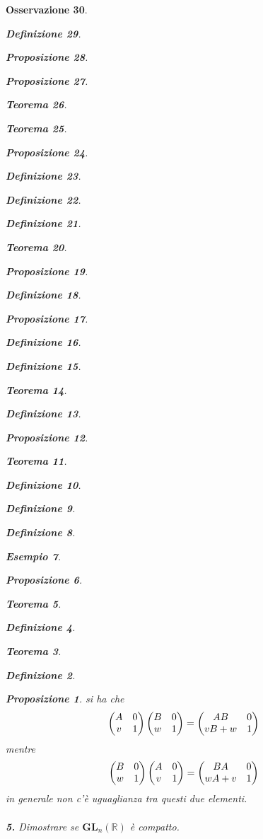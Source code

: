 \documentclass[oneside, 11pt]{amsbook}
\makeatletter
\newcommand{\0}{{(0)}}
\newcommand{\3}{{(3)}}
\theoremstyle{colonplain}
\newtheorem{thm}{Teorema}[chapter]
\newtheorem{prop}[thm]{Proposizione}
\theoremstyle{colondefinition}
\newtheorem{defn}[thm]{Definizione}
\newtheorem{ex}[thm]{Esempio}
\theoremstyle{colonremark}
\newtheorem{rmk}[thm]{Osservazione}
\numberwithin{equation}{chapter}
\renewcommand{\proofname}{Dimostrazione}
\renewenvironment{proof}[1][\proofname]{\par
  \pushQED{\end{proof}}%
  \normalfont \topsep6\p@\@plus6\p@\relax
  \trivlist
  \item[\hskip\labelsep\bfseries #1:]\ignorespaces
}{%
  \popQED\endtrivlist\@endpefalse
}
\makeatother
\begin{document}
\begin{rmk}
\begin{defn}
\begin{prop}
\begin{prop}
\begin{thm}
\begin{thm}
\begin{prop}
\begin{defn}
\begin{defn}
\begin{defn}
\begin{thm}
\begin{prop}
\begin{defn}
\begin{prop}
\begin{defn}
\begin{defn}
\begin{thm}
\begin{defn}
\begin{prop}
\begin{thm}
\begin{defn}
\begin{defn}
\begin{defn}
\begin{ex}
\begin{prop}
\begin{thm}
\begin{defn}
\begin{thm}
\begin{defn}
\begin{prop}
\begin{proof}
\begin{proof}
\begin{proof}
\begin{proof} si ha che
\begin{align}
    \begin{pmatrix}
        A & 0 \\
        v & 1
    \end{pmatrix}
    \begin{pmatrix}
        B & 0 \\
        w & 1
    \end{pmatrix} = 
    \begin{pmatrix}
        AB & 0 \\
        vB + w & 1
    \end{pmatrix} \notag
\end{align}
mentre
\begin{align}
    \begin{pmatrix}
        B & 0 \\
        w & 1
    \end{pmatrix}
    \begin{pmatrix}
        A & 0 \\
        v & 1
    \end{pmatrix} = 
    \begin{pmatrix}
        BA & 0 \\
        wA + v & 1
    \end{pmatrix} \notag
\end{align}
in generale non c'è uguaglianza tra questi due elementi. \\ \\
\textbf{5.} Dimostrare se $\mathbf{GL}_n(\mathbb{R})$ è compatto. \\


\end{proof}
\end{proof}
\end{proof}
\end{proof}
\end{prop}
\end{defn}
\end{thm}
\end{defn}
\end{thm}
\end{prop}
\end{ex}
\end{defn}
\end{defn}
\end{defn}
\end{thm}
\end{prop}
\end{defn}
\end{thm}
\end{defn}
\end{defn}
\end{prop}
\end{defn}
\end{prop}
\end{thm}
\end{defn}
\end{defn}
\end{defn}
\end{prop}
\end{thm}
\end{thm}
\end{prop}
\end{prop}
\end{defn}
\end{rmk}
\end{document}
